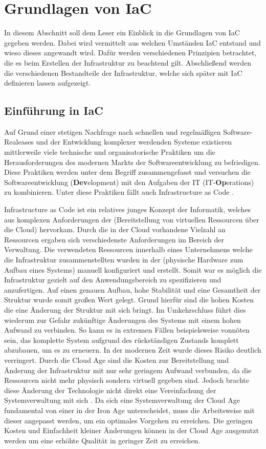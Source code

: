 \documentclass[biblatex]{lni}
\begin{document}
\section{Grundlagen von IaC}
In diesem Abschnitt soll dem Leser ein Einblick in die Grundlagen von IaC gegeben werden. Dabei wird vermittelt aus welchen Umständen IaC entstand und wieso dieses angewandt wird. Dafür werden verschiedenen Prinzipien betrachtet, die es beim Erstellen der Infrastruktur zu beachtend gilt. Abschließend werden die verschiedenen Bestandteile der Infrastruktur, welche sich später mit IaC definieren lassen aufgezeigt.
\subsection{Einführung in IaC}
Auf Grund einer stetigen Nachfrage nach schnellen und regelmäßigen Software-Realeases und der Entwicklung komplexer werdenden Systeme existieren mittlerweile viele technische und organisatorische Praktiken um die Herausforderungen des modernen Markts der Softwareentwicklung zu befriedigen. Diese Praktiken werden unter dem Begriff  zusammengefasst und versuchen die Softwareentwicklung (\textbf{Dev}elopment) mit den Aufgaben der IT (IT-\textbf{Op}erations) zu kombinieren. Unter diese Praktiken fällt auch Infrastructure as Code \cite[S. 580-581]{Guerriero.2019}.

Infrastructure as Code ist ein relatives junges Konzept der Informatik, welches aus komplexen Anforderungen der  (Bereitstellung von virtuellen Ressourcen über die Cloud) hervorkam. Durch die in der Cloud vorhandene Vielzahl an Ressourcen ergaben sich verschiedenste Anforderungen im Bereich der Verwaltung. Die verwendeten Ressourcen innerhalb eines Unternehmens welche die Infrastruktur zusammenstellten wurden in der  (physische Hardware zum Aufbau eines Systems) manuell konfiguriert und erstellt. Somit war es möglich die Infrastruktur gezielt auf den Anwendungsbereich zu spezifizieren und anzufertigen. Auf einen genauen Aufbau, hohe Stabilität und eine Gesamtheit der Struktur wurde somit großen Wert gelegt. Grund hierfür sind die hohen Kosten die eine Änderung der Struktur mit sich bringt. Im Umkehrschluss führt dies wiederum zur Gefahr zukünftige Änderungen des Systems mit einem hohen Aufwand zu verbinden. So kann es in extremen Fällen beispielsweise vonnöten sein, das komplette System aufgrund des rückständigen Zustands komplett abzubauen, um es zu erneuern. In der modernen Zeit wurde dieses Risiko deutlich verringert. Durch die Cloud Age sind die Kosten zur Bereitstellung und Änderung der Infrastruktur mit nur sehr geringem Aufwand verbunden, da die Ressourcen nicht mehr physisch sondern virtuell gegeben sind. Jedoch brachte diese Änderung der Technologie nicht direkt eine Vereinfachung der Systemverwaltung mit sich \cite{Morris.December2020}. Da sich eine Systemverwaltung der Cloud Age fundamental von einer in der Iron Age unterscheidet, muss die Arbeitsweise mit dieser angepasst werden, um ein optimales Vorgehen zu erreichen. Die geringen Kosten und Einfachheit kleiner Änderungen können in der Cloud Age ausgenutzt werden um eine erhöhte Qualität in geringer Zeit zu erreichen.
\end{document}
